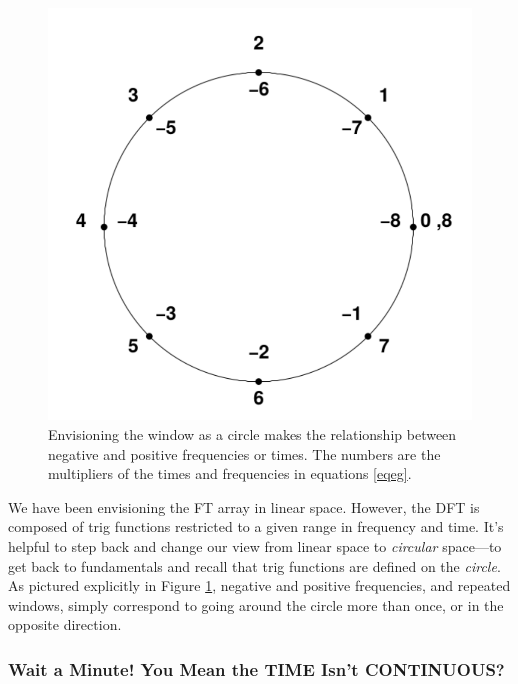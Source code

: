 \documentclass[11pt,preprint]{aastex}
\begin{document}
\begin{figure}[H]
\begin{center}
\leavevmode
\includegraphics[width=6.0in]{ftfig1.pdf}
\end{center}
\caption{Envisioning the window as a circle makes the relationship
between negative and positive frequencies or times. The numbers are the
multipliers of the times and frequencies in equations \ref{eqeg}.
\label{ftfig1} }
\end{figure}

\enlargethispage{0.4in}
\noindent We have been envisioning the FT array in linear space. 
However, the DFT is composed of trig functions restricted to a given
range in frequency and time.  It's helpful to step back and change our
view from linear space to {\it circular} space---to get back to
fundamentals and recall that trig functions are defined on the {\it
circle}.  As pictured explicitly in Figure \ref{ftfig1}, negative and
positive frequencies, and repeated windows, simply correspond to going
around the circle more than once, or in the opposite direction.

\subsubsection{Wait a Minute! You Mean the TIME Isn't CONTINUOUS?}
\end{document}

